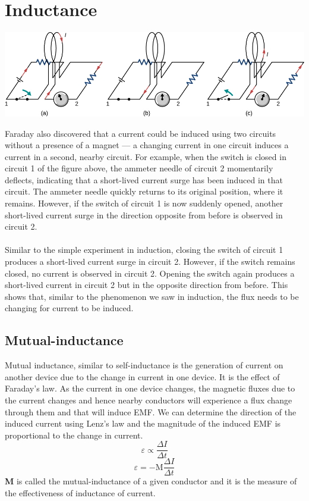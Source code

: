 \documentclass[11pt]{article}
\begin{document}
	\section*{Inductance}
	\begin{center}
		\includegraphics[scale=0.8]{faraday_ind}
	\end{center}
	Faraday also discovered that a current could be induced using two circuits without a presence of a magnet — a changing current in one circuit induces a current in a second, nearby circuit. For example, when the switch is closed in circuit 1 of the figure above, the ammeter needle of circuit 2 momentarily deflects, indicating that a short-lived current surge has been induced in that circuit. The ammeter needle quickly returns to its original position, where it remains. However, if the switch of circuit 1 is now suddenly opened, another short-lived current surge in the direction opposite from before is observed in circuit 2. \\ \\
	Similar to the simple experiment in induction, closing the switch of circuit 1 produces a short-lived current surge in circuit 2. However, if the switch remains closed, no current is observed in circuit 2. Opening the switch again produces a short-lived current in circuit 2 but in the opposite direction from before. This shows that, similar to the phenomenon we saw in induction, the flux needs to be changing for current to be induced.
	\subsection*{Mutual-inductance}
	Mutual inductance, similar to self-inductance is the generation of current on another device due to the change in current in one device. It is the effect of Faraday's law. As the current in one device changes, the magnetic fluxes due to the current changes and hence nearby conductors will experience a flux change through them and that will induce EMF. We can determine the direction of the induced current using Lenz's law and the magnitude of the induced EMF is proportional to the change in current.
	$$\varepsilon\propto\dfrac{\varDelta I}{\varDelta t}$$
	$$\varepsilon=-\text{M}\dfrac{\varDelta I}{\varDelta t}$$
	\textbf{M} is called the mutual-inductance of a given conductor and it is the measure of the effectiveness of inductance of current.
\end{document}
